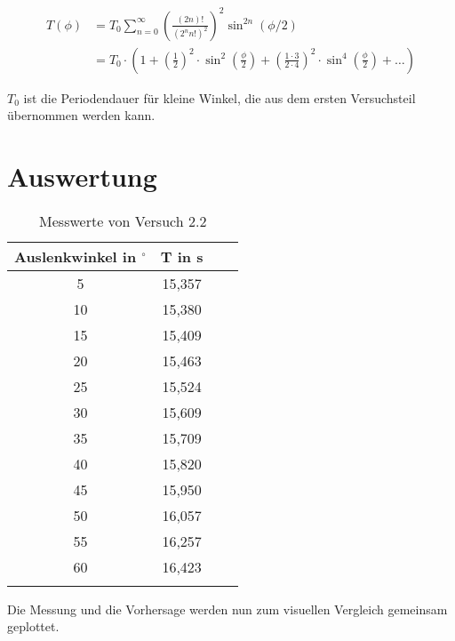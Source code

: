 \begin{align}
	T(\phi) & = T_0 \sum_{n=0}^{\infty} \left( \frac{\left(2n\right)!}{\left(2^{n}n!\right)^2} \right)^2 \sin^{2n} \left(\phi /2\right) \\
& = T_0\cdot\left(1+\left(\frac{1}{2}\right)^2 \cdot \sin^2\left(\frac{\phi}{2}\right)+\left(\frac{1\cdot 3}{2\cdot 4}\right)^2 \cdot \sin^4\left(\frac{\phi}{2}\right) + \dots\right)
\end{align}

$T_0$ ist die Periodendauer für kleine Winkel, die aus dem ersten Versuchsteil übernommen werden kann.

\section{Auswertung}

\begin{table}[h!]
    \begin{center}
        \caption{Messwerte von Versuch 2.2}
        \begin{tabular}{cccc}
            \hline
            Auslenkwinkel in $ ^{\circ}$ & T in s \\
            \hline
            5                  & 15,357 \\
            10                & 15,380 \\
            15                & 15,409 \\
            20                & 15,463 \\
            25                & 15,524 \\
            30                & 15,609 \\
            35                & 15,709 \\
            40                & 15,820 \\
            45                & 15,950 \\
            50                & 16,057 \\
            55                & 16,257 \\
            60                & 16,423 \\
            \hline
            \label{tab:2_2-werte}
        \end{tabular}
    \end{center}
\end{table}


Die Messung und die Vorhersage werden nun zum visuellen Vergleich gemeinsam geplottet.

